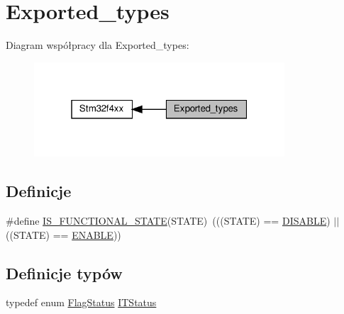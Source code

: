 \hypertarget{group___exported__types}{}\section{Exported\+\_\+types}
\label{group___exported__types}
Diagram współpracy dla Exported\+\_\+types\+:\nopagebreak
\begin{figure}[H]
\begin{center}
\leavevmode
\includegraphics[width=265pt]{group___exported__types}
\end{center}
\end{figure}
\subsection*{Definicje}
\begin{DoxyCompactItemize}
\item 
\#define \hyperlink{group___exported__types_gaffaf7c3f537d7a3370b1bbdda67a2bf6}{I\+S\+\_\+\+F\+U\+N\+C\+T\+I\+O\+N\+A\+L\+\_\+\+S\+T\+A\+TE}(S\+T\+A\+TE)~(((S\+T\+A\+TE) == \hyperlink{group___exported__types_ggac9a7e9a35d2513ec15c3b537aaa4fba1ad3a9df141be0ccf10389b640f492b26d}{D\+I\+S\+A\+B\+LE}) $\vert$$\vert$ ((S\+T\+A\+TE) == \hyperlink{group___exported__types_ggac9a7e9a35d2513ec15c3b537aaa4fba1a7d46875fa3ebd2c34d2756950eda83bf}{E\+N\+A\+B\+LE}))
\end{DoxyCompactItemize}
\subsection*{Definicje typów}
\begin{DoxyCompactItemize}
\item 
typedef enum \hyperlink{group___exported__types_ga89136caac2e14c55151f527ac02daaff}{Flag\+Status} \hyperlink{group___exported__types_gaacbd7ed539db0aacd973a0f6eca34074}{I\+T\+Status}
\end{DoxyCompactItemize}
